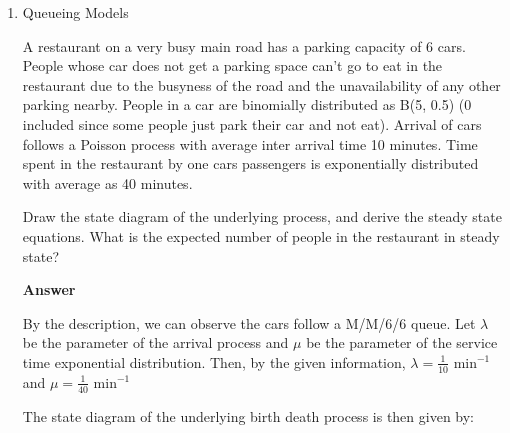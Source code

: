 \documentclass[12pt, oneside]{article}
\begin{document}
\begin{enumerate}
\item {
    Queueing Models

    A restaurant on a very busy main road has a parking capacity of 6 cars. People whose car
    does not get a parking space can't go to eat in the restaurant due to the busyness of
    the road and the unavailability of any other parking nearby. People in a car are binomially
    distributed as B(5, 0.5) (0 included since some people just park their car and not eat). 
    Arrival of cars follows a Poisson process with average inter arrival time 10 minutes.
    Time spent in the restaurant by one cars passengers is exponentially distributed with 
    average as 40 minutes.

    Draw the state diagram of the underlying process, and derive the steady state equations.
    What is the expected number of people in the restaurant in steady state?

    \textbf{Answer}

    By the description, we can observe the cars follow a M/M/6/6 queue.
    Let \(\lambda\) be the parameter of the arrival process and \(\mu\) be the parameter 
    of the service time exponential distribution. Then, by the given information,
    \(\lambda = \frac{1}{10} \text{ min}^{-1}\) and \(\mu = \frac{1}{40} \text{ min}^{-1}\)
    
    The state diagram of the underlying birth death process is then given by:


}
\end{enumerate}
\end{document}
